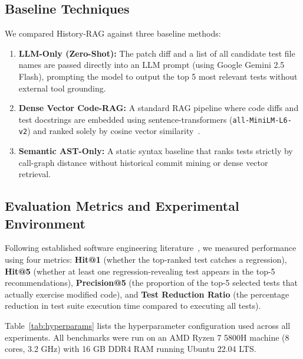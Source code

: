 \documentclass[12pt,onecolumn,draftclsnofoot]{IEEEtran}
\begin{document}
\subsection{Baseline Techniques}
We compared History-RAG against three baseline methods:
\begin{enumerate}
    \item \textbf{LLM-Only (Zero-Shot):} The patch diff and a list of all candidate test file names are passed directly into an LLM prompt (using Google Gemini 2.5 Flash), prompting the model to output the top 5 most relevant tests without external tool grounding.
    \item \textbf{Dense Vector Code-RAG:} A standard RAG pipeline where code diffs and test docstrings are embedded using sentence-transformers (\texttt{all-MiniLM-L6-v2}) and ranked solely by cosine vector similarity~\cite{lewis2020retrieval}.
    \item \textbf{Semantic AST-Only:} A static syntax baseline that ranks tests strictly by call-graph distance without historical commit mining or dense vector retrieval.
\end{enumerate}

\subsection{Evaluation Metrics and Experimental Environment}
Following established software engineering literature~\cite{yoo2012regression, engstrom2010systematic}, we measured performance using four metrics: \textbf{Hit@1} (whether the top-ranked test catches a regression), \textbf{Hit@5} (whether at least one regression-revealing test appears in the top-5 recommendations), \textbf{Precision@5} (the proportion of the top-5 selected tests that actually exercise modified code), and \textbf{Test Reduction Ratio} (the percentage reduction in test suite execution time compared to executing all tests).

Table~\ref{tab:hyperparams} lists the hyperparameter configuration used across all experiments. All benchmarks were run on an AMD Ryzen 7 5800H machine (8 cores, 3.2 GHz) with 16 GB DDR4 RAM running Ubuntu 22.04 LTS.
\end{document}

